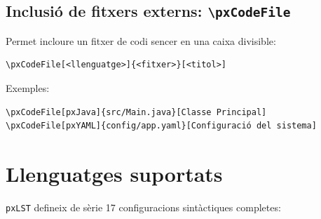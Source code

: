 \documentclass[11pt,a4paper]{article}
\begin{document}
\subsection{Inclusi\'o de fitxers externs: \texttt{\textbackslash pxCodeFile}}

Permet incloure un fitxer de codi sencer en una caixa divisible:

\begin{verbatim}
\pxCodeFile[<llenguatge>]{<fitxer>}[<titol>]
\end{verbatim}

Exemples:

\begin{verbatim}
\pxCodeFile[pxJava]{src/Main.java}[Classe Principal]
\pxCodeFile[pxYAML]{config/app.yaml}[Configuració del sistema]
\end{verbatim}

\section{Llenguatges suportats}

\texttt{pxLST} defineix de s\`erie 17 configuracions sint\`actiques completes:
\end{document}
